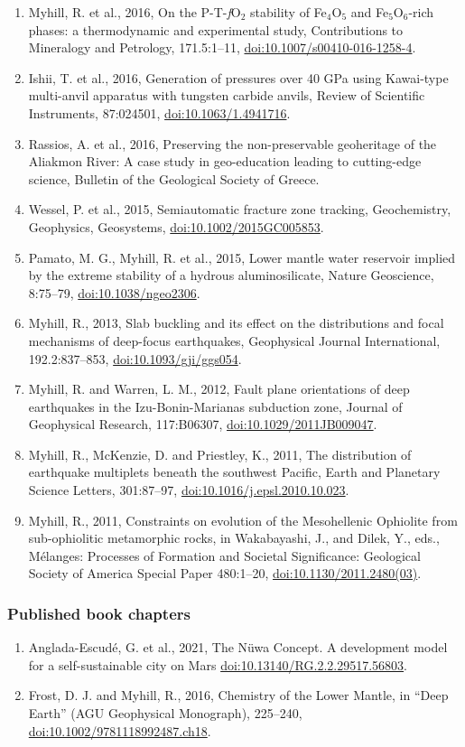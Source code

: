\documentclass[11pt,twoside,a4paper]{article}
\newcommand{\doi}[1]{\href{http://dx.doi.org/#1}{doi:#1}}
\begin{document}
\begin{enumerate}
\item Myhill, R. et al., 2016, On the P-T-\emph{f}O$_2$ stability of Fe$_4$O$_5$ and Fe$_5$O$_6$-rich phases: a thermodynamic and experimental study, Contributions to Mineralogy and Petrology, 171.5:1--11, \doi{10.1007/s00410-016-1258-4}.
 \item Ishii, T. et al., 2016, Generation of pressures over 40 GPa using Kawai-type multi-anvil apparatus with tungsten carbide anvils, Review of Scientific Instruments, 87:024501, \doi{10.1063/1.4941716}.
 \item Rassios, A. et al., 2016, Preserving the non-preservable geoheritage of the Aliakmon River: A case study in geo-education leading to cutting-edge science, Bulletin of the Geological Society of Greece.
\item  Wessel, P. et al., 2015, Semiautomatic fracture zone tracking, Geochemistry, Geophysics, Geosystems, \doi{10.1002/2015GC005853}.
\item Pamato, M. G., Myhill, R. et al., 2015, Lower mantle water reservoir implied by the extreme stability of a hydrous aluminosilicate, Nature Geoscience, 8:75--79, \doi{10.1038/ngeo2306}.
\item Myhill, R., 2013, Slab buckling and its effect on the distributions and focal mechanisms of deep-focus earthquakes, Geophysical Journal International, 192.2:837--853, \doi{10.1093/gji/ggs054}.
\item Myhill, R. and Warren, L. M., 2012, Fault plane orientations of deep earthquakes in the Izu-Bonin-Marianas subduction zone, Journal of Geophysical Research, 117:B06307, \doi{10.1029/2011JB009047}.
\item Myhill, R., McKenzie, D. and Priestley, K., 2011, The distribution of earthquake multiplets beneath the southwest Pacific, Earth and Planetary Science Letters, 301:87--97, \doi{10.1016/j.epsl.2010.10.023}.
\item Myhill, R., 2011, Constraints on evolution of the Mesohellenic Ophiolite from sub-ophiolitic metamorphic rocks, in Wakabayashi, J., and Dilek, Y., eds., M\'elanges: Processes of Formation and Societal Significance: Geological Society of America Special Paper 480:1--20, \doi{10.1130/2011.2480(03)}.
\end{enumerate}

\subsubsection*{Published book chapters}
\begin{enumerate}
 \item Anglada-Escud\'{e}, G. et al., 2021, The N\"{u}wa Concept. A development model for a self-sustainable city on Mars \doi{10.13140/RG.2.2.29517.56803}.
 \item Frost, D. J. and Myhill, R., 2016, Chemistry of the Lower Mantle, in ``Deep Earth'' (AGU Geophysical Monograph), 225--240, \doi{10.1002/9781118992487.ch18}.
\end{enumerate}
\end{document}
